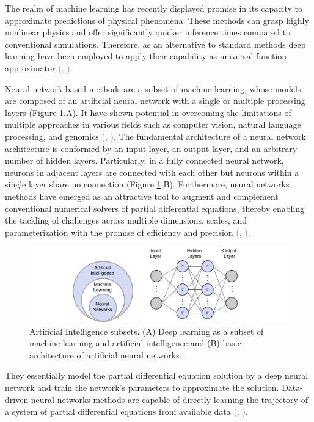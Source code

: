 \documentclass{tufte-handout}
\renewcommand{\citep}[2][]{\textcolor{gray}{(\citeauthor{#2}, \citeyear[#1]{#2})}}
\begin{document}
The realm of machine learning has recently displayed promise in its capacity to approximate predictions of physical phenomena. These methods can grasp highly nonlinear physics and offer significantly quicker inference times compared to conventional simulations. Therefore, as an alternative to standard methods deep learning have been employed to apply their capability as universal function approximator \citep{hornik_approximation_1991}.

Neural network based methods are a subset of machine learning, whose models are composed of an artificial neural network with a single or multiple processing layers (Figure \ref{deep_learning_subset_architecture}.A). It have shown potential in overcoming the limitations of multiple approaches in various fields such as computer vision, natural language processing, and genomics \citep{lecun_deep_2015,goodfellow_deep_2016}. The fundamental architecture of a neural network architecture is conformed by an input layer, an output layer, and an arbitrary number of hidden layers. Particularly, in a fully connected neural network, neurons in adjacent layers are connected with each other but neurons within a single layer share no connection (Figure \ref{deep_learning_subset_architecture}.B). Furthermore, neural networks methods have emerged as an attractive tool to augment and complement conventional numerical solvers of partial differential equations, thereby enabling the tackling of challenges across multiple dimensions, scales, and parameterization with the promise of efficiency and precision \citep{blechschmidt_three_2021}. 

\begin{figure}
    \includegraphics{figs/Artificial_Intelligence_subsets.pdf}
    \caption{Artificial Intelligence subsets. (A) Deep learning as a subset of machine learning and artificial intelligence and (B) basic architecture of artificial neural networks.}    
    \label{deep_learning_subset_architecture}
\end{figure}

They essentially model the partial differential equation solution by a deep neural network and train the network’s parameters to approximate the solution. Data-driven neural networks methods are capable of directly learning the trajectory of a system of partial differential equations from available data \citep{li_neural_2020,li_fourier_2021}.
\end{document}
